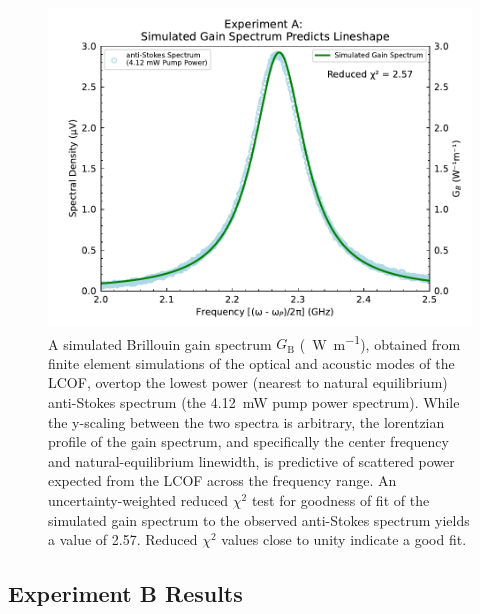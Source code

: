 \begin{figure}[t!]
  \centering
  \includegraphics[width=\textwidth]{figs/3-Cooling/P-O Simulated Gain.pdf}
  \caption{A simulated Brillouin gain spectrum \(G_{\mathrm{B}}\) (\si{\per\watt\per\meter}), obtained from finite element simulations\cite{johnson2023laser} of the optical and acoustic modes of the \ac{LCOF}, overtop the lowest power (nearest to natural equilibrium) anti-Stokes spectrum (the \SI{4.12}{\milli\watt} pump power spectrum). While the y-scaling between the two spectra is arbitrary, the lorentzian profile of the gain spectrum, and specifically the center frequency and natural-equilibrium linewidth, is predictive of scattered power expected from the \ac{LCOF} across the frequency range. An uncertainty-weighted reduced \(\chi^{2}\) test for goodness of fit of the simulated gain spectrum to the observed anti-Stokes spectrum yields a value of 2.57. Reduced \(\chi^{2}\) values close to unity indicate a good fit.}
  \label{fig:Cooling:P-O Simulated Gain}
\end{figure}


\subsection{Experiment B Results}
\label{Cooling:subsec:ExperimentBResults}

